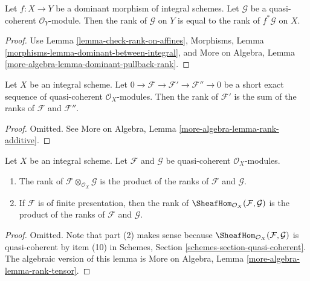 \begin{lemma}
\label{lemma-dominant-pullback-rank}
Let $f : X \to Y$ be a dominant morphism of integral schemes.
Let $\mathcal{G}$ be a quasi-coherent $\mathcal{O}_Y$-module.
Then the rank of $\mathcal{G}$ on $Y$ is equal to the rank
of $f^*\mathcal{G}$ on $X$.
\end{lemma}

\begin{proof}
Use Lemma \ref{lemma-check-rank-on-affines},
Morphisms, Lemma \ref{morphisms-lemma-dominant-between-integral},
and
More on Algebra, Lemma \ref{more-algebra-lemma-dominant-pullback-rank}.
\end{proof}

\begin{lemma}
\label{lemma-rank-additive}
Let $X$ be an integral scheme.
Let $0 \to \mathcal{F} \to \mathcal{F}' \to \mathcal{F}'' \to 0$
be a short  exact sequence of quasi-coherent $\mathcal{O}_X$-modules.
Then the rank of $\mathcal{F}'$ is the sum of the ranks of
$\mathcal{F}$ and $\mathcal{F}''$.
\end{lemma}

\begin{proof}
Omitted. See More on Algebra, Lemma \ref{more-algebra-lemma-rank-additive}.
\end{proof}

\begin{lemma}
\label{lemma-rank-tensor}
Let $X$ be an integral scheme. Let
$\mathcal{F}$ and $\mathcal{G}$ be
quasi-coherent $\mathcal{O}_X$-modules.
\begin{enumerate}
\item The rank of $\mathcal{F} \otimes_{\mathcal{O}_X} \mathcal{G}$
is the product of the ranks of $\mathcal{F}$ and $\mathcal{G}$.
\item If $\mathcal{F}$ is of finite presentation, then
the rank of $\SheafHom_{\mathcal{O}_X}(\mathcal{F}, \mathcal{G})$
is the product of the ranks of $\mathcal{F}$ and $\mathcal{G}$.
\end{enumerate}
\end{lemma}

\begin{proof}
Omitted. Note that part (2) makes sense because
$\SheafHom_{\mathcal{O}_X}(\mathcal{F}, \mathcal{G})$
is quasi-coherent by item (10) in
Schemes, Section \ref{schemes-section-quasi-coherent}.
The algebraic version of this lemma is
More on Algebra, Lemma \ref{more-algebra-lemma-rank-tensor}.
\end{proof}

